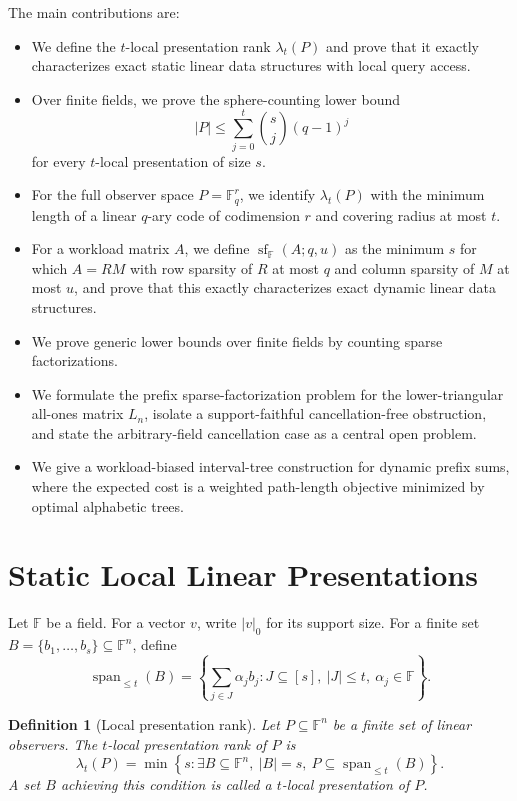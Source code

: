 \documentclass[11pt]{article}
\newtheorem{definition}[theorem]{Definition}
\begin{document}
The main contributions are:
\begin{itemize}
\item We define the $t$-local presentation rank $\lambda_t(P)$ and prove that it exactly characterizes exact static linear data structures with local query access.
\item Over finite fields, we prove the sphere-counting lower bound
\[
|P|\le \sum_{j=0}^t {s\choose j}(q-1)^j
\]
for every $t$-local presentation of size $s$.
\item For the full observer space $P=\mathbb F_q^r$, we identify $\lambda_t(P)$ with the minimum length of a linear $q$-ary code of codimension $r$ and covering radius at most $t$.
\item For a workload matrix $A$, we define $\operatorname{sf}_{\mathbb F}(A;q,u)$ as the minimum $s$ for which $A=RM$ with row sparsity of $R$ at most $q$ and column sparsity of $M$ at most $u$, and prove that this exactly characterizes exact dynamic linear data structures.
\item We prove generic lower bounds over finite fields by counting sparse factorizations.
\item We formulate the prefix sparse-factorization problem for the lower-triangular all-ones matrix $L_n$, isolate a support-faithful cancellation-free obstruction, and state the arbitrary-field cancellation case as a central open problem.
\item We give a workload-biased interval-tree construction for dynamic prefix sums, where the expected cost is a weighted path-length objective minimized by optimal alphabetic trees.
\end{itemize}

\section{Static Local Linear Presentations}

Let $\mathbb F$ be a field. For a vector $v$, write $|v|_0$ for its support size. For a finite set $B=\{b_1,\ldots,b_s\}\subseteq\mathbb F^n$, define
\[
\operatorname{span}_{\le t}(B)
=
\left\{
\sum_{j\in J}\alpha_j b_j:
J\subseteq [s],\ |J|\le t,\ \alpha_j\in\mathbb F
\right\}.
\]

\begin{definition}[Local presentation rank]
Let $P\subseteq\mathbb F^n$ be a finite set of linear observers. The $t$-local presentation rank of $P$ is
\[
\lambda_t(P)
=
\min\left\{
s:
\exists B\subseteq\mathbb F^n,\ |B|=s,\ P\subseteq \operatorname{span}_{\le t}(B)
\right\}.
\]
A set $B$ achieving this condition is called a $t$-local presentation of $P$.
\end{definition}
\end{document}
